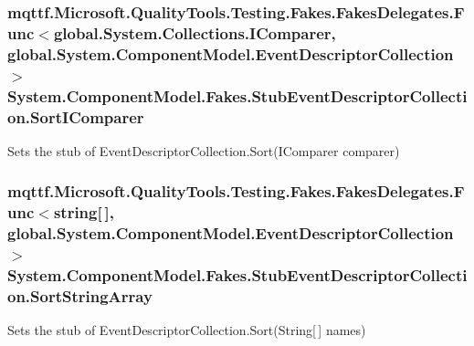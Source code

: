 \hypertarget{class_system_1_1_component_model_1_1_fakes_1_1_stub_event_descriptor_collection_ac594d2ba26e8c1d2a68cd9618a64beb7}{
\subsubsection[{Sort\-I\-Comparer}]{\setlength{\rightskip}{0pt plus 5cm}mqttf.\-Microsoft.\-Quality\-Tools.\-Testing.\-Fakes.\-Fakes\-Delegates.\-Func$<$global.\-System.\-Collections.\-I\-Comparer, global.\-System.\-Component\-Model.\-Event\-Descriptor\-Collection$>$ System.\-Component\-Model.\-Fakes.\-Stub\-Event\-Descriptor\-Collection.\-Sort\-I\-Comparer}}\label{class_system_1_1_component_model_1_1_fakes_1_1_stub_event_descriptor_collection_ac594d2ba26e8c1d2a68cd9618a64beb7}


Sets the stub of Event\-Descriptor\-Collection.\-Sort(\-I\-Comparer comparer)

\hypertarget{class_system_1_1_component_model_1_1_fakes_1_1_stub_event_descriptor_collection_a67e78fc45f37fb93aac7424dce34c37e}{
\subsubsection[{Sort\-String\-Array}]{\setlength{\rightskip}{0pt plus 5cm}mqttf.\-Microsoft.\-Quality\-Tools.\-Testing.\-Fakes.\-Fakes\-Delegates.\-Func$<$string\mbox{[}$\,$\mbox{]}, global.\-System.\-Component\-Model.\-Event\-Descriptor\-Collection$>$ System.\-Component\-Model.\-Fakes.\-Stub\-Event\-Descriptor\-Collection.\-Sort\-String\-Array}}\label{class_system_1_1_component_model_1_1_fakes_1_1_stub_event_descriptor_collection_a67e78fc45f37fb93aac7424dce34c37e}


Sets the stub of Event\-Descriptor\-Collection.\-Sort(\-String\mbox{[}$\,$\mbox{]} names)

